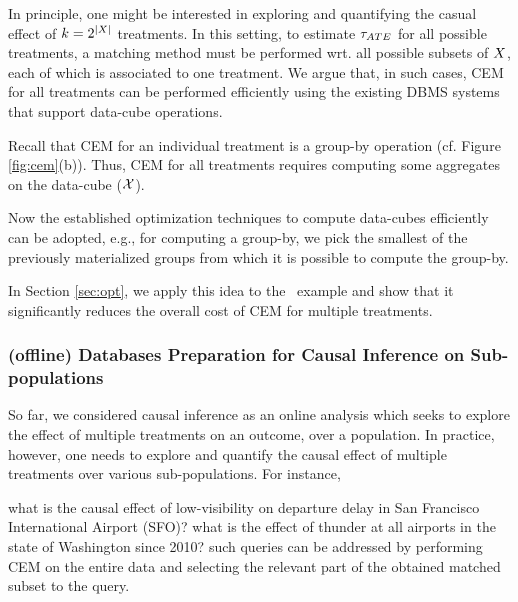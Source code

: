 In principle, one might be interested
in exploring and quantifying the casual effect of $k=2^{|{{X}}|}$ treatments. In this setting, to estimate ${\tau_{ATE}}$ for all possible treatments, a matching method must be performed wrt. all possible subsets of ${{X}}$, each of which is associated to
one treatment. We argue that, in such cases, CEM for all treatments can be performed efficiently using the existing DBMS systems that support data-cube operations.


Recall that CEM for an individual treatment is a group-by operation (cf. Figure \ref{fig:cem}(b)). Thus, CEM for all treatments requires computing some aggregates on the data-cube (${{\mathcal{X}}}$).  Now the established optimization techniques to
 compute data-cubes efficiently  can be adopted, e.g., for computing a group-by, we pick the
 smallest of the previously materialized groups from which it is possible to compute the group-by.
 In Section \ref{sec:opt}, we apply this idea to the \delay \ example and show that
it significantly reduces the overall cost of CEM for multiple treatments.


\vspace{-0.1cm}
\subsubsection{(offline) Databases Preparation for Causal Inference on Sub-populations}
\label{sec:dp}

So far, we considered causal inference as an online analysis which seeks to explore the effect of multiple treatments on an outcome, over a
population. In practice, however, one needs to explore and quantify the causal effect of
multiple treatments over various
sub-populations. For instance,  what is the causal
 effect of low-visibility on departure delay in San Francisco International Airport (SFO)?  what is the effect of thunder at all airports in the state of Washington since 2010?
  such queries can be addressed by performing CEM on the entire data and selecting the relevant part of the obtained matched subset to the query.

